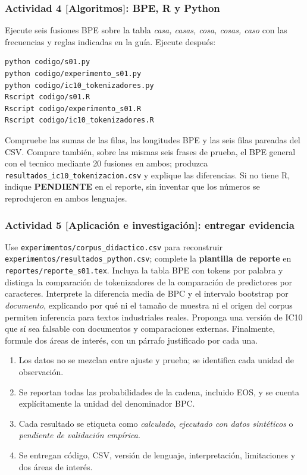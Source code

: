 \subsubsection*{Actividad 4 [Algoritmos]: BPE, R y Python}
Ejecute seis fusiones BPE sobre la tabla \emph{casa, casas, cosa, cosas,
caso} con las frecuencias y reglas indicadas en la guía. Ejecute después:
\begin{verbatim}
python codigo/s01.py
python codigo/experimento_s01.py
python codigo/ic10_tokenizadores.py
Rscript codigo/s01.R
Rscript codigo/experimento_s01.R
Rscript codigo/ic10_tokenizadores.R
\end{verbatim}
Compruebe las sumas de las filas, las longitudes BPE y las seis filas
pareadas del CSV. Compare también, sobre las mismas seis frases
de prueba, el BPE general con el tecnico mediante 20 fusiones en ambos;
produzca \nolinkurl{resultados_ic10_tokenizacion.csv} y explique las diferencias.
Si no tiene R, indique \textbf{PENDIENTE} en el reporte,
sin inventar que los números se reprodujeron en ambos lenguajes.
\subsubsection*{Actividad 5 [Aplicación e investigación]: entregar evidencia}
Use \nolinkurl{experimentos/corpus_didactico.csv} para reconstruir
\nolinkurl{experimentos/resultados_python.csv}; complete la
\textbf{plantilla de reporte} en \nolinkurl{reportes/reporte_s01.tex}.
Incluya la tabla BPE con tokens por palabra y distinga la comparación
de tokenizadores de la comparación de predictores por caracteres.
Interprete la diferencia media de BPC y el intervalo bootstrap por
\emph{documento}, explicando por qué ni el tamaño de muestra ni el origen
del corpus permiten inferencia para textos industriales reales.
Proponga una versión de IC10 que sí sea falsable con documentos y
comparaciones externas. Finalmente, formule dos áreas de interés,
con un párrafo justificado por cada una.
\begin{verificacion}
\begin{enumerate}
\item Los datos no se mezclan entre ajuste y prueba; se identifica cada
unidad de observación.
\item Se reportan todas las probabilidades de la cadena, incluido EOS,
y se cuenta explícitamente la unidad del denominador BPC.
\item Cada resultado se etiqueta como \emph{calculado}, \emph{ejecutado
con datos sintéticos} o \emph{pendiente de validación empírica}.
\item Se entregan código, CSV, versión de lenguaje, interpretación,
limitaciones y dos áreas de interés.
\end{enumerate}
\end{verificacion}
